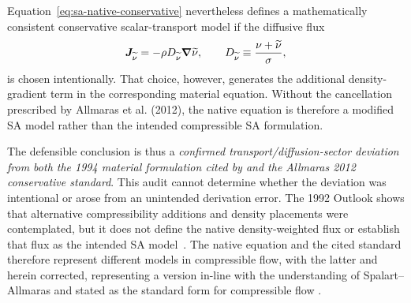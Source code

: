 
Equation~\eqref{eq:sa-native-conservative} nevertheless defines a
mathematically consistent conservative scalar-transport model if the diffusive
flux
\begin{equation}
  \boldsymbol J_{\widetilde{\nu}}
  =-\rho D_{\widetilde{\nu}}\boldsymbol{\nabla}\widetilde{\nu},
  \qquad
  D_{\widetilde{\nu}}\equiv\frac{\nu+\widetilde{\nu}}{\sigma},
  \label{eq:sa-native-fickian-flux}
\end{equation}
is chosen intentionally.  That choice, however, generates the additional
density-gradient term in the corresponding material equation.  Without the
cancellation prescribed by Allmaras et al. (2012), the native equation is
therefore a modified SA model rather than the intended compressible SA
formulation.

The defensible conclusion is thus a \emph{confirmed
transport/diffusion-sector deviation from both the 1994 material formulation
cited by \SAOF{} and the Allmaras 2012 conservative standard}.  This audit
cannot determine whether the deviation was intentional or arose from an
unintended derivation error.  The 1992 Outlook shows that alternative
compressibility additions and density placements were contemplated, but it
does not define the native density-weighted flux or establish that flux as the
intended SA model~\cite{SpalartAllmaras1994,SpalartAllmaras1992,AJS2012}.  The
native \SAOF{} equation and the cited standard therefore represent different
models in compressible flow, with the latter and herein corrected, representing a version in-line with the understanding of Spalart--Allmaras and stated as the standard form for compressible flow \cite{AJS2012}.

